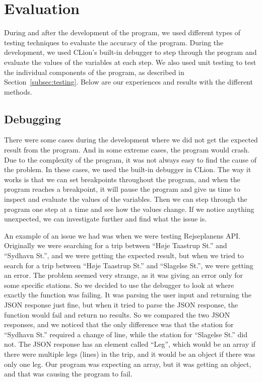 \section{Evaluation}\label{sec:evaluation}

During and after the development of the program, we used different types of testing techniques to evaluate the accuracy
of the program.
During the development, we used CLion's built-in debugger to step through the program and evaluate the
values of the variables at each step.
We also used unit testing to test the individual components of the program, as described in
Section~\ref{subsec:testing}.
Below are our experiences and results with the different methods.

\subsection{Debugging}\label{subsec:debugging}

There were some cases during the development where we did not get the expected result from the program.
And in some extreme cases, the program would crash.
Due to the complexity of the program, it was not always easy to find the cause of the problem.
In these cases, we used the built-in debugger in CLion.
The way it works is that we can set breakpoints throughout the program, and when the program reaches a breakpoint, it
will pause the program and give us time to inspect and evaluate the values of the variables.
Then we can step through the program one step at a time and see how the values change.
If we notice anything unexpected, we can investigate further and find what the issue is.

An example of an issue we had was when we were testing Rejseplanens API.
Originally we were searching for a trip between ``Høje Taastrup St.'' and ``Sydhavn St.'', and we were getting the
expected result, but when we tried to search for a trip between ``Høje Taastrup St.'' and ``Slagelse St.'', we were
getting an error.
The problem seemed very strange, as it was giving an error only for some specific stations.
So we decided to use the debugger to look at where exactly the function was failing.
It was parsing the user input and returning the JSON response just fine, but when it tried to parse the JSON response,
the function would fail and return no results.
So we compared the two JSON responses, and we noticed that the only difference was that the station for ``Sydhavn St.''
required a change of line, while the station for ``Slagelse St.'' did not.
The JSON response has an element called ``Leg'', which would be an array if there were multiple legs (lines) in the
trip, and it would be an object if there was only one leg.
Our program was expecting an array, but it was getting an object, and that was causing the program to fail.

